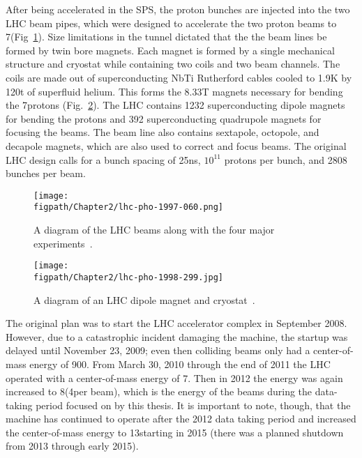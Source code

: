 \clearpage

After being accelerated in the SPS, the proton bunches are injected into the two LHC beam pipes, which were designed to accelerate the two proton beams to 7\TeV (Fig~\ref{fig:LHC_beams}).
Size limitations in the tunnel dictated that the the beam lines be formed by twin bore magnets.
Each magnet is formed by a single mechanical structure and cryostat while containing two coils and two beam channels.
The coils are made out of superconducting NbTi Rutherford cables cooled to 1.9\unit{K} by 120\unit{t} of superfluid helium.
This forms the 8.33\unit{T} magnets necessary for bending the 7\TeV protons (Fig.~\ref{fig:LHC_magnet}).
The LHC contains 1232 superconducting dipole magnets for bending the protons and 392 superconducting quadrupole magnets for focusing the beams.
The beam line also contains sextapole, octopole, and decapole magnets, which are also used to correct and focus beams.
The original LHC design calls for a bunch spacing of 25\unit{ns}, $10^{11}$ protons per bunch, and 2808 bunches per beam.

\begin{figure}[!hbt]
	\centering
	\texttt{[image: \\figpath/Chapter2/lhc-pho-1997-060.png]}
	\caption{A diagram of the LHC beams along with the four major experiments~\cite{Jean-Luc:841573}.}
	\label{fig:LHC_beams}
\end{figure}

\begin{figure}[!hbt]
	\centering
	\texttt{[image: \\figpath/Chapter2/lhc-pho-1998-299.jpg]}
	\caption{A diagram of an LHC dipole magnet and cryostat~\cite{Dailler:842253}.}
	\label{fig:LHC_magnet}
\end{figure}

The original plan was to start the LHC accelerator complex in September 2008.
However, due to a catastrophic incident damaging the machine, the startup was delayed until November 23, 2009; even then colliding beams only had a center-of-mass energy of 900\GeV.
From March 30, 2010 through the end of 2011 the LHC operated with a center-of-mass energy of 7\TeV.
Then in 2012 the energy was again increased to 8\TeV (4\TeV per beam), which is the energy of the beams during the data-taking period focused on by this thesis.
It is important to note, though, that the machine has continued to operate after the 2012 data taking period and increased the center-of-mass energy to 13\TeV starting in 2015 (there was a planned shutdown from 2013 through early 2015).

